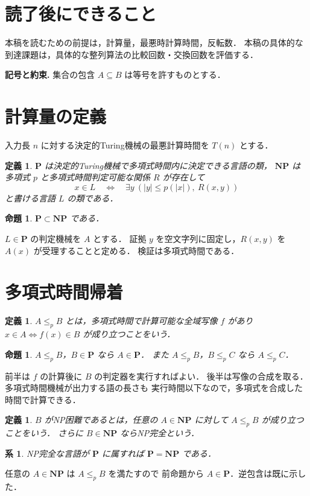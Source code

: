 \documentclass[a5paper,10pt,onecolumn]{jsarticle}
\makeatletter
\theoremstyle{mathnotetheorem}
\newtheorem{definition}[theorem]{定義}
\newtheorem{proposition}[theorem]{命題}
\newtheorem{corollary}[theorem]{系}
\renewcommand{\proofname}{証明}
\renewenvironment{proof}[1][\proofname]{%
  \par\pushQED{\qed}\normalfont\topsep4\p@\@plus2\p@\relax
  \trivlist\item[\hskip\labelsep\bfseries #1]\ignorespaces
}{\popQED\endtrivlist\@endpefalse}
\makeatother
\begin{document}
\section*{読了後にできること}
本稿を読むための前提は，計算量，最悪時計算時間，反転数．
本稿の具体的な到達課題は，具体的な整列算法の比較回数・交換回数を評価する．


\par\noindent\textbf{記号と約束.}\quad
集合の包含 $A\subseteq B$ は等号を許すものとする．
\par

\section{計算量の定義}
入力長 $n$ に対する決定的Turing機械の最悪計算時間を $T(n)$ とする．
\begin{definition}
$\mathbf P$ は決定的Turing機械で多項式時間内に決定できる言語の類，
$\mathbf{NP}$ は多項式 $p$ と多項式時間判定可能な関係 $R$ が存在して
\[
 x\in L\quad\Longleftrightarrow\quad
 \exists y\ (|y|\le p(|x|),\ R(x,y))
\]
と書ける言語 $L$ の類である．
\end{definition}
\begin{proposition}
$\mathbf P\subset\mathbf{NP}$ である．
\end{proposition}
\begin{proof}
$L\in\mathbf P$ の判定機械を $A$ とする．
証拠 $y$ を空文字列に固定し，$R(x,y)$ を $A(x)$ が受理することと定める．
検証は多項式時間である．
\end{proof}
\section{多項式時間帰着}
\begin{definition}
$A\le_p B$ とは，多項式時間で計算可能な全域写像 $f$ があり
$x\in A\iff f(x)\in B$ が成り立つことをいう．
\end{definition}
\begin{proposition}
$A\le_p B$，$B\in\mathbf P$ なら $A\in\mathbf P$．
また $A\le_p B$，$B\le_p C$ なら $A\le_p C$．
\end{proposition}
\begin{proof}
前半は $f$ の計算後に $B$ の判定器を実行すればよい．
後半は写像の合成を取る．多項式時間機械が出力する語の長さも
実行時間以下なので，多項式を合成した時間で計算できる．
\end{proof}
\begin{definition}
$B$ がNP困難であるとは，任意の $A\in\mathbf{NP}$ に対して
$A\le_p B$ が成り立つことをいう．
さらに $B\in\mathbf{NP}$ ならNP完全という．
\end{definition}
\begin{corollary}
NP完全な言語が $\mathbf P$ に属すれば $\mathbf P=\mathbf{NP}$ である．
\end{corollary}
\begin{proof}
任意の $A\in\mathbf{NP}$ は $A\le_p B$ を満たすので
前命題から $A\in\mathbf P$．逆包含は既に示した．
\end{proof}
\end{document}
